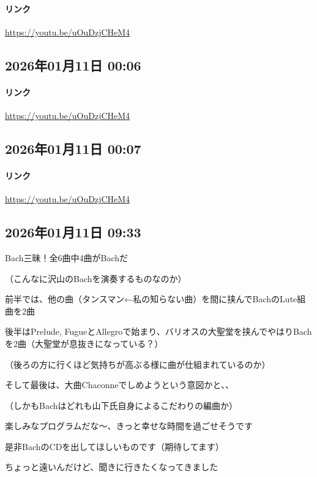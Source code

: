 \paragraph{リンク}
\url{https://youtu.be/uOuDzjCHeM4}

\subsection*{2026年01月11日 00:06}

\paragraph{リンク}
\url{https://youtu.be/uOuDzjCHeM4}

\subsection*{2026年01月11日 00:07}

\paragraph{リンク}
\url{https://youtu.be/uOuDzjCHeM4}

\subsection*{2026年01月11日 09:33}

Bach三昧！全6曲中4曲がBachだ

（こんなに沢山のBachを演奏するものなのか）

前半では、他の曲（タンスマン←私の知らない曲）を間に挟んでBachのLute組曲を2曲

後半はPrelude, FugueとAllegroで始まり、バリオスの大聖堂を挟んでやはりBachを2曲（大聖堂が息抜きになっている？）

（後ろの方に行くほど気持ちが高ぶる様に曲が仕組まれているのか）

そして最後は、大曲Chaconneでしめようという意図かと、、

（しかもBachはどれも山下氏自身によるこだわりの編曲か）

楽しみなプログラムだな〜、きっと幸せな時間を過ごせそうです

是非BachのCDを出してほしいものです（期待してます）

ちょっと遠いんだけど、聞きに行きたくなってきました

